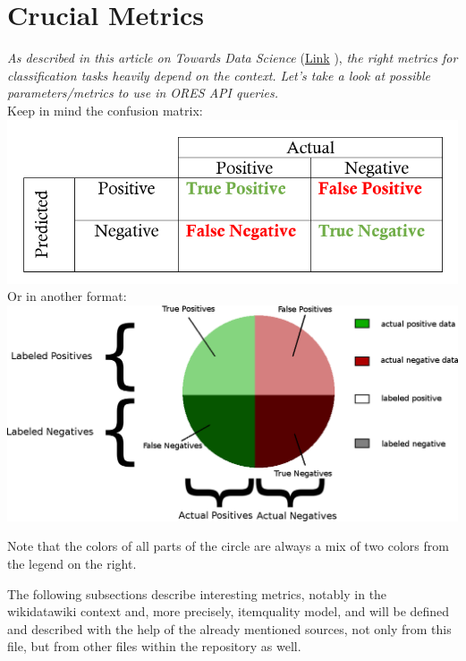 \documentclass[12pt,a4paper]{article}
\begin{document}
\section{Crucial Metrics}
\textit{As described in this article on Towards Data Science} (\href{https://towardsdatascience.com/beyond-accuracy-precision-and-recall-3da06bea9f6c}{Link}
), \textit{the right metrics for classification tasks heavily depend on the context. Let's take a look at possible parameters/metrics to use in ORES API queries.}
\\
Keep in mind the confusion matrix:\\
\includegraphics[scale=0.4]{resources/3/confusionMatrix}\\
Or in another format:\\
\includegraphics[scale=0.4]{resources/3/confusionCircle}
\begin{description}
\item Note that the colors of all parts of the circle are always a mix of two colors from the legend on the right.
\end{description}
The following subsections describe interesting metrics, notably in the wikidatawiki context and, more precisely, itemquality model, and will be defined and described with the help of the already mentioned sources, not only from this file, but from other files within the repository as well. 
\end{document}
